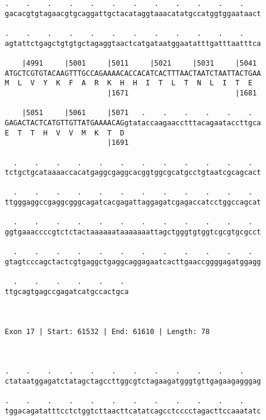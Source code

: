 \documentclass{article}
\begin{document}
\begin{Verbatim}
.    .    .    .    .    .    .    .    .    .    .    .    
gacacgtgtagaacgtgcaggattgctacataggtaaacatatgccatggtggaataact
                                                            
.    .    .    .    .    .    .    .    .    .    .    .    
agtattctgagctgtgtgctagaggtaactcatgataatggaatatttgatttaatttca
                                                            
    |4991     |5001     |5011     |5021     |5031     |5041 
ATGCTCGTGTACAAGTTTGCCAGAAAACACCACATCACTTTAACTAATCTAATTACTGAA
M  L  V  Y  K  F  A  R  K  H  H  I  T  L  T  N  L  I  T  E  
                        |1671                         |1681 
  
    |5051     |5061     |5071   .    .    .    .    .    .  
GAGACTACTCATGTTGTTATGAAAACAGgtataccaagaacctttacagaataccttgca
E  T  T  H  V  V  M  K  T  D                                
                        |1691                               
  
  .    .    .    .    .    .    .    .    .    .    .    .  
tctgctgcataaaaccacatgaggcgaggcacggtggcgcatgcctgtaatcgcagcact
                                                            
  .    .    .    .    .    .    .    .    .    .    .    .  
ttgggaggccgaggcgggcagatcacgagattaggagatcgagaccatcctggccagcat
                                                            
  .    .    .    .    .    .    .    .    .    .    .    .  
ggtgaaaccccgtctctactaaaaaataaaaaaattagctgggtgtggtcgcgtgcgcct
                                                            
  .    .    .    .    .    .    .    .    .    .    .    .  
gtagtcccagctactcgtgaggctgaggcaggagaatcacttgaaccggggagatggagg
                                                            
  .    .    .    .    .    . 
ttgcagtgagccgagatcatgccactgca
                             
                             
 
Exon 17 | Start: 61532 | End: 61610 | Length: 78



.    .    .    .    .    .    .    .    .    .    .    .    
ctataatggagatctatagctagccttggcgtctagaagatgggtgttgagaagagggag
                                                            
.    .    .    .    .    .    .    .    .    .    .    .    
tggacagatatttcctctggtcttaacttcatatcagcctcccctagacttccaaatatc
                                                            

\end{Verbatim}
\end{document}
